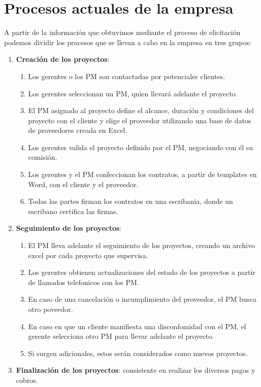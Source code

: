 \section{Procesos actuales de la empresa}

A partir de la información que obtuvimos mediante el proceso de elicitación podemos dividir los procesos que se llevan a cabo en la empresa en tres grupos:
\begin{enumerate}
    \item \textbf{Creación de los proyectos}:
    \begin{enumerate}
        \item Los gerentes o los PM son contactadas por potenciales clientes.
        \item Los gerentes seleccionan un PM, quien llevará adelante el proyecto.
        \item El PM asignado al proyecto define el alcance, duración y condiciones del proyecto con el cliente y elige el proveedor utilizando una base de datos de proveedores creada en Excel.
        \item Los gerentes valida el proyecto definido por el PM, negociando con él su comisión.
        \item Los gerentes y el PM confeccionan los contratos, a partir de templates en Word, con el cliente y el proveedor.
        \item Todas las partes firman los contratos en una escribania, donde un escribano certifica las firmas.
    \end{enumerate}    
    \item \textbf{Seguimiento de los proyectos}:
    \begin{enumerate}
        \item El PM lleva adelante el seguimiento de los proyectos, creando un archivo excel por cada proyecto que supervisa.   
        \item Los gerentes obtienen actualizaciones del estado de los proyectos a partir de llamados telefonicos con los PM.
        \item En caso de una cancelación o incumplimiento del proveedor, el PM busca otro poveedor.
        \item En caso en que un cliente manifiesta una disconfomidad con el PM, el gerente selecciona otro PM para llevar adelante el proyecto.
        \item Si surgen adicionales, estos serán considerados como nuevos proyectos.
    \end{enumerate}
    \item \textbf{Finalización de los proyectos}: consistente en realizar los diversos pagos y cobros.    
\end{enumerate}

